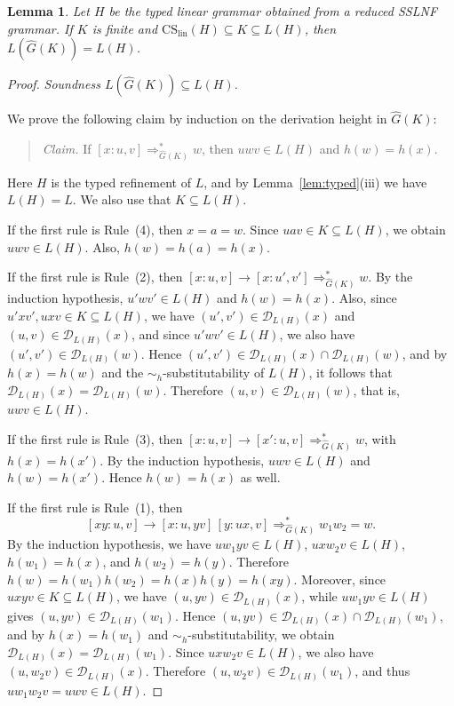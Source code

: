 \documentclass[11pt,a4paper]{article}
\newtheorem{lemma}[theorem]{Lemma}
\newcommand{\D}{\mathcal{D}}
\newcommand{\CS}{\mathrm{CS}}
\newcommand{\lin}{\mathrm{lin}}
\begin{document}
\begin{lemma}
\label{lem:linear-complete}
Let $H$ be the typed linear grammar obtained from a reduced SSLNF grammar.
If $K$ is finite and $\CS_{\lin}(H)\subseteq K\subseteq L(H)$, then $L(\hat G(K))=L(H)$.
\end{lemma}

\begin{proof}
\noindent\emph{Soundness $L(\hat G(K))\subseteq L(H)$.}

We prove the following claim by induction on the derivation height in $\hat G(K)$:
\begin{quote}
\emph{Claim.}
If $[x:u,v]\Rightarrow_{\hat G(K)}^* w$, then $uwv\in L(H)$ and $h(w)=h(x)$.
\end{quote}
Here $H$ is the typed refinement of $L$, and by
Lemma~\ref{lem:typed}\textup{(iii)} we have $L(H)=L$.
We also use that $K\subseteq L(H)$.

If the first rule is Rule~\textup{(4)}, then $x=a=w$.
Since $uav\in K\subseteq L(H)$, we obtain $uwv\in L(H)$.
Also, $h(w)=h(a)=h(x)$.

If the first rule is Rule~\textup{(2)}, then
$[x:u,v]\to[x:u',v']\Rightarrow_{\hat G(K)}^* w$.
By the induction hypothesis, $u'wv'\in L(H)$ and $h(w)=h(x)$.
Also, since $u'xv',uxv\in K\subseteq L(H)$, we have
$(u',v')\in \D_{L(H)}(x)$ and $(u,v)\in \D_{L(H)}(x)$,
and since $u'wv'\in L(H)$, we also have
$(u',v')\in \D_{L(H)}(w)$.
Hence $(u',v')\in \D_{L(H)}(x)\cap \D_{L(H)}(w)$, and by
$h(x)=h(w)$ and the $\sim_h$-substitutability of $L(H)$, it follows that
$\D_{L(H)}(x)=\D_{L(H)}(w)$.
Therefore $(u,v)\in \D_{L(H)}(w)$, that is, $uwv\in L(H)$.

If the first rule is Rule~\textup{(3)}, then
$[x:u,v]\to[x':u,v]\Rightarrow_{\hat G(K)}^* w$, with $h(x)=h(x')$.
By the induction hypothesis, $uwv\in L(H)$ and $h(w)=h(x')$.
Hence $h(w)=h(x)$ as well.

If the first rule is Rule~\textup{(1)}, then
\[
[xy:u,v]\to[x:u,yv]\,[y:ux,v]\Rightarrow_{\hat G(K)}^* w_1w_2=w.
\]
By the induction hypothesis, we have
$uw_1yv\in L(H)$, $uxw_2v\in L(H)$,
$h(w_1)=h(x)$, and $h(w_2)=h(y)$.
Therefore
$h(w)=h(w_1)h(w_2)=h(x)h(y)=h(xy)$.
Moreover, since $uxyv\in K\subseteq L(H)$, we have
$(u,yv)\in \D_{L(H)}(x)$,
while $uw_1yv\in L(H)$ gives
$(u,yv)\in \D_{L(H)}(w_1)$.
Hence $(u,yv)\in \D_{L(H)}(x)\cap \D_{L(H)}(w_1)$, and by
$h(x)=h(w_1)$ and $\sim_h$-substitutability, we obtain
$\D_{L(H)}(x)=\D_{L(H)}(w_1)$.
Since $uxw_2v\in L(H)$, we also have
$(u,w_2v)\in \D_{L(H)}(x)$.
Therefore $(u,w_2v)\in \D_{L(H)}(w_1)$, and thus
$uw_1w_2v=uwv\in L(H)$.


\end{proof}
\end{document}
